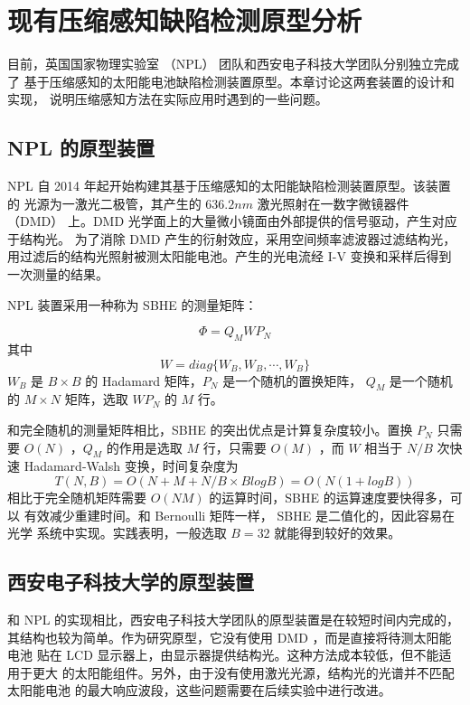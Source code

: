\chapter{现有压缩感知缺陷检测原型分析}

目前，英国国家物理实验室 （NPL） 团队和西安电子科技大学团队分别独立完成了
基于压缩感知的太阳能电池缺陷检测装置原型。本章讨论这两套装置的设计和实现，
说明压缩感知方法在实际应用时遇到的一些问题。

\section{NPL 的原型装置}

NPL 自 2014 年起开始构建其基于压缩感知的太阳能缺陷检测装置原型。该装置的
光源为一激光二极管，其产生的 $636.2 nm$ 激光照射在一数字微镜器件 （DMD）
上。DMD 光学面上的大量微小镜面由外部提供的信号驱动，产生对应于结构光。
为了消除 DMD 产生的衍射效应，采用空间频率滤波器过滤结构光，
用过滤后的结构光照射被测太阳能电池。产生的光电流经 I-V
变换和采样后得到一次测量的结果。

NPL 装置采用一种称为 SBHE 的测量矩阵：\cite{BlockHadamard}
\begin{definition}[SBHE 矩阵]
\begin{equation}
\Phi = Q_M W P_N
\end{equation}
其中
\begin{equation}
W = diag\{W_B, W_B, \cdots, W_B\}
\end{equation}
$W_B$ 是 $B \times B$ 的 Hadamard 矩阵，$P_N$ 是一个随机的置换矩阵，
$Q_M$ 是一个随机的 $M \times N$ 矩阵，选取 $W P_N$ 的 $M$ 行。
\end{definition}

和完全随机的测量矩阵相比，SBHE 的突出优点是计算复杂度较小。置换
$P_N$ 只需要 $O(N)$ ，$Q_M$ 的作用是选取 $M$ 行，只需要 $O(M)$ ，而
$W$ 相当于 $N/B$ 次快速 Hadamard-Walsh 变换，时间复杂度为
\begin{equation}
T(N,B) = O(N + M + N/B \times B log B) = O(N(1+logB))
\end{equation}
相比于完全随机矩阵需要 $O(NM)$ 的运算时间，SBHE 的运算速度要快得多，可以
有效减少重建时间。和 Bernoulli 矩阵一样， SBHE 是二值化的，因此容易在光学
系统中实现。实践表明，一般选取 $B=32$ 就能得到较好的效果。

\section{西安电子科技大学的原型装置}

和 NPL 的实现相比，西安电子科技大学团队的原型装置是在较短时间内完成的，
其结构也较为简单。作为研究原型，它没有使用 DMD ，而是直接将待测太阳能电池
贴在 LCD 显示器上，由显示器提供结构光。这种方法成本较低，但不能适用于更大
的太阳能组件。另外，由于没有使用激光光源，结构光的光谱并不匹配太阳能电池
的最大响应波段，这些问题需要在后续实验中进行改进。

